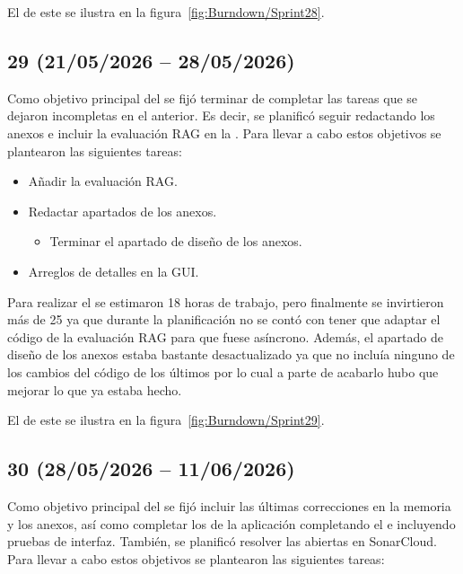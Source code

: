 El  de este  se ilustra en la figura~\ref{fig:Burndown/Sprint28}.

\subsection{ 29 (21/05/2026 -- 28/05/2026)}
Como objetivo principal del  se fijó terminar de completar las tareas que se dejaron incompletas en el  anterior. Es decir, se planificó seguir redactando los anexos e incluir la evaluación RAG en la . Para llevar a cabo estos objetivos se plantearon las siguientes tareas:
\begin{itemize}
	\item Añadir la evaluación RAG.
	\item Redactar apartados de los anexos.
	\begin{itemize}
		\item Terminar el apartado de diseño de los anexos.
	\end{itemize}
	\item Arreglos de detalles en la GUI.
\end{itemize}

Para realizar el  se estimaron 18 horas de trabajo, pero finalmente se invirtieron más de 25 ya que durante la planificación no se contó con tener que adaptar el código de la evaluación RAG para que fuese asíncrono. Además, el apartado de diseño de los anexos estaba bastante desactualizado ya que no incluía ninguno de los cambios del código de los últimos  por lo cual a parte de acabarlo hubo que mejorar lo que ya estaba hecho.

El  de este  se ilustra en la figura~\ref{fig:Burndown/Sprint29}.

\subsection{ 30 (28/05/2026 -- 11/06/2026)}

Como objetivo principal del  se fijó incluir las últimas correcciones en la memoria y los anexos, así como completar los  de la aplicación  completando el  e incluyendo pruebas de interfaz. También, se planificó resolver las  abiertas en SonarCloud. Para llevar a cabo estos objetivos se plantearon las siguientes tareas:


